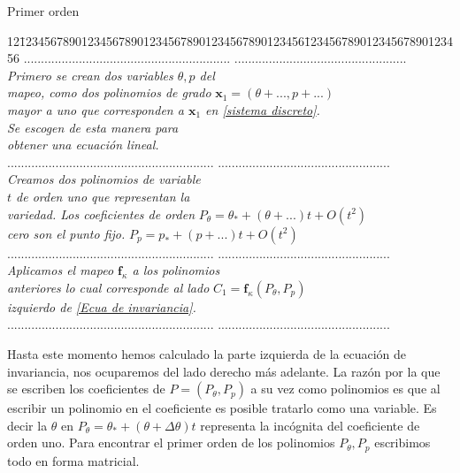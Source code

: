 \begin{center}
Primer orden
\begin{tabbing}
12\=1234567890123456789012345678901234567890123456\=12345678901234567890123456\kill%
\>............................................................  \>..................................................\\
\>\textsl{Primero se crean dos variables $\theta,p$ del} \> \\
\>\textsl{mapeo, como dos polinomios de grado} \>$\mathbf{x}_{1}=(\theta+... ,p+...)$  \\
\>\textsl{mayor a uno que corresponden a $\mathbf{x}_{1}$ en \ref{sistema discreto}.}\>   \\
\>\textsl{Se escogen de esta manera para }\>   \\
\>\textsl{obtener una ecuación lineal. }\>   \\
\>............................................................  \>..................................................\\
\>\textsl{Creamos dos polinomios de variable}\> \\
\>\textsl{$t$ de orden uno que representan la }  \> \\
\>\textsl{variedad. Los coeficientes de orden }\> $P_{\theta}=\theta_{*}+(\theta+...)t+O(t^{2})$\\
\>\textsl{cero son el punto fijo.} \> $ P_{p}=p_{*}+(p+...)t+O(t^{2})$\\
\>............................................................  \>..................................................\\
\>\textsl{Aplicamos el mapeo $\mathbf{f}_{\kappa}$ a los polinomios  }\> \\
\>\textsl{anteriores lo cual corresponde al lado } \>$C_{1}=\mathbf{f}_{\kappa}(P_{\theta},P_{p})$  \\
\>\textsl{izquierdo de \ref{Ecua de invariancia}.} \> \\
\>............................................................  \>..................................................\\
\end{tabbing} 


\end{center}
Hasta este momento hemos calculado la parte izquierda de la ecuación de invariancia, nos ocuparemos del lado derecho más adelante. La razón por la que se escriben los coeficientes de $P=(P_{\theta},P_{p})$ a su vez como polinomios es que al escribir un polinomio en el coeficiente es posible tratarlo como una variable. Es decir la $\theta$ en $P_{\theta}=\theta_{*}+(\theta+\Delta \theta)t$ representa la incógnita del coeficiente de orden uno. Para encontrar el primer orden de los polinomios $P_{\theta},P_{p}$ escribimos todo en forma matricial.
